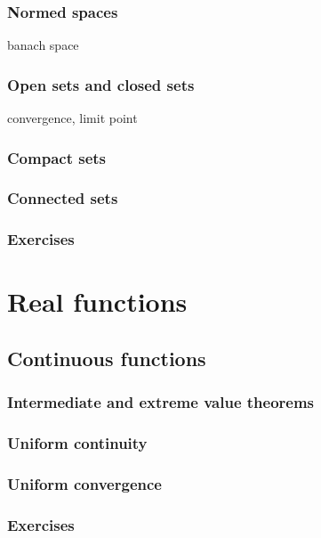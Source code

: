 \documentclass{../note}
\begin{document}
\section{Normed spaces}
banach space

\section{Open sets and closed sets}
convergence, limit point
\section{Compact sets}
\section{Connected sets}



\section*{Exercises}








\part{Real functions}

\chapter{Continuous functions}
\section{Intermediate and extreme value theorems}
\section{Uniform continuity}
\section{Uniform convergence}

\section*{Exercises}
\end{document}
